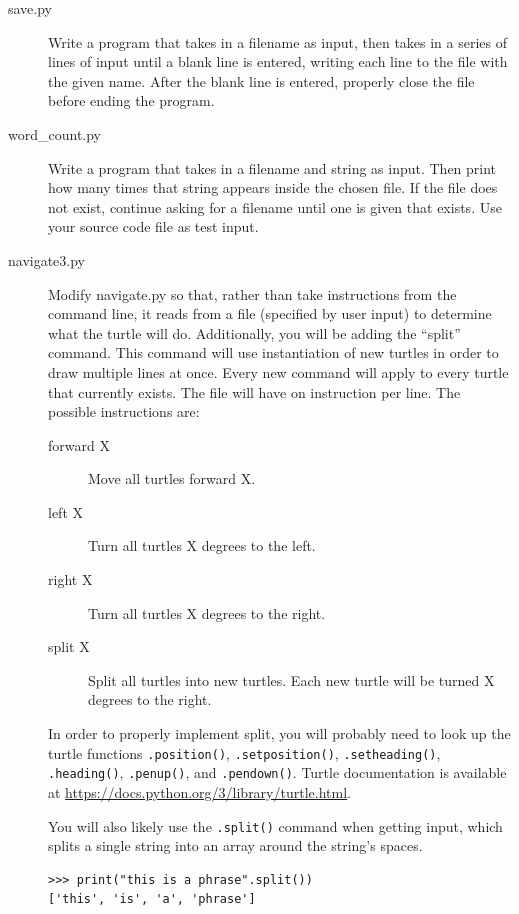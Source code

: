\documentclass[11pt]{cselabheader}
\begin{document}
\begin{description}
\item[save.py] Write a program that takes in a filename as input, then takes in
  a series of lines of input until a blank line is entered, writing each line to
  the file with the given name. After the blank line is entered, properly close
  the file before ending the program.  

\item[word\_count.py] Write a program that
  takes in a filename and string as input. Then print how many times that string
  appears inside the chosen file. If the file does not exist, continue asking
  for a filename until one is given that exists. Use your source code file as
  test input.

\item[navigate3.py] Modify navigate.py so that, rather than take instructions
  from the command line, it reads from a file (specified by user input) to
  determine what the turtle will do. Additionally, you will be adding the
  ``split'' command. This command will use instantiation of new turtles in order
  to draw multiple lines at once. Every new command will apply to every turtle
  that currently exists. The file will have on instruction per line. The
  possible instructions are:

  \begin{description}
    \item[forward X] Move all turtles forward X.
    \item[left X] Turn all turtles X degrees to the left.
    \item[right X] Turn all turtles X degrees to the right.
    \item[split X] Split all turtles into new turtles. Each new turtle will be turned X degrees to the right.
  \end{description}

  In order to properly implement split, you will probably need to look up the
  turtle functions \lstinline{.position()}, \lstinline{.setposition()},
  \lstinline{.setheading()}, \lstinline{.heading()}, \lstinline{.penup()}, and
  \lstinline{.pendown()}. Turtle documentation is available at
  \url{https://docs.python.org/3/library/turtle.html}.

  You will also likely use the \lstinline{.split()} command when getting input, which splits a single string into an array around the string's spaces.
  \begin{lstlisting}[style=ipython]
>>> print("this is a phrase".split())
['this', 'is', 'a', 'phrase']
  \end{lstlisting}


\end{description}
\end{document}
